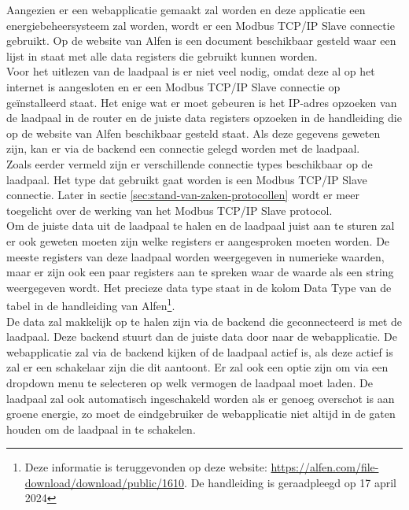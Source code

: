 Aangezien er een webapplicatie gemaakt zal worden en deze applicatie een energiebeheersysteem zal worden, wordt er een Modbus TCP/IP Slave connectie gebruikt. Op de website van Alfen is een document beschikbaar gesteld waar een lijst in staat met alle data registers die gebruikt kunnen worden.\\

Voor het uitlezen van de laadpaal is er niet veel nodig, omdat deze al op het internet is aangesloten en er een Modbus TCP/IP Slave connectie op geïnstalleerd staat. Het enige wat er moet gebeuren is het IP-adres opzoeken van de laadpaal in de router en de juiste data registers opzoeken in de handleiding die op de website van Alfen beschikbaar gesteld staat. Als deze gegevens geweten zijn, kan er via de backend een connectie gelegd worden met de laadpaal.\\

Zoals eerder vermeld zijn er verschillende connectie types beschikbaar op de laadpaal. Het type dat gebruikt gaat worden is een Modbus TCP/IP Slave connectie. Later in sectie \ref{sec:stand-van-zaken-protocollen} wordt er meer toegelicht over de werking van het Modbus TCP/IP Slave protocol.\\

Om de juiste data uit de laadpaal te halen en de laadpaal juist aan te sturen zal er ook geweten moeten zijn welke registers er aangesproken moeten worden. De meeste registers van deze laadpaal worden weergegeven in numerieke waarden, maar er zijn ook een paar registers aan te spreken waar de waarde als een string weergegeven wordt. Het precieze data type staat in de kolom Data Type van de tabel in de handleiding van Alfen\footnote{Deze informatie is teruggevonden op deze website: \url{https://alfen.com/file-download/download/public/1610}. De handleiding is geraadpleegd op 17 april 2024}.\\

De data zal makkelijk op te halen zijn via de backend die geconnecteerd is met de laadpaal. Deze backend stuurt dan de juiste data door naar de webapplicatie. De webapplicatie zal via de backend kijken of de laadpaal actief is, als deze actief is zal er een schakelaar zijn die dit aantoont. Er zal ook een optie zijn om via een dropdown menu te selecteren op welk vermogen de laadpaal moet laden. De laadpaal zal ook automatisch ingeschakeld worden als er genoeg overschot is aan groene energie, zo moet de eindgebruiker de webapplicatie niet altijd in de gaten houden om de laadpaal in te schakelen.

